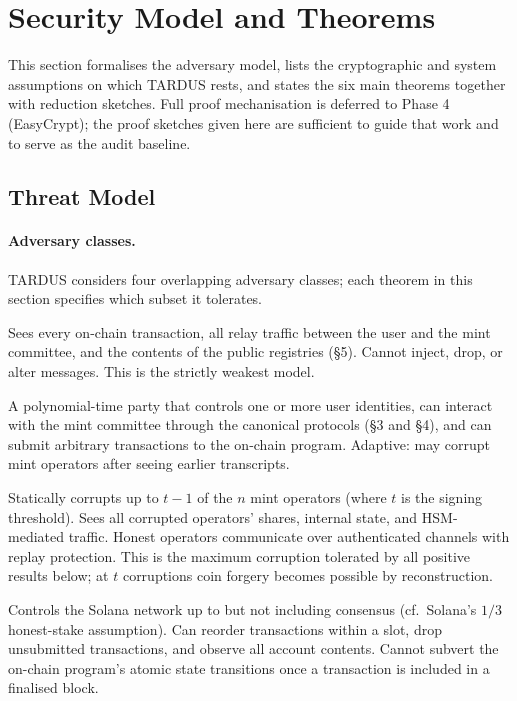 \section{Security Model and Theorems}
\label{sec:security}

This section formalises the adversary model, lists the cryptographic and
system assumptions on which TARDUS rests, and states the six main theorems
together with reduction sketches. Full proof mechanisation is deferred to
Phase 4 (EasyCrypt); the proof sketches given here are sufficient to guide
that work and to serve as the audit baseline.

\subsection{Threat Model}
\label{sec:threat-model}

\paragraph{Adversary classes.} TARDUS considers four overlapping adversary
classes; each theorem in this section specifies which subset it tolerates.

\begin{description}[leftmargin=2em,style=nextline]
  \item[$\Adv_{\mathsf{net}}$ (passive observer)]
    Sees every on-chain transaction, all relay traffic between the user and
    the mint committee, and the contents of the public registries
    (\S5). Cannot inject, drop, or alter messages. This is
    the strictly weakest model.
  \item[$\Adv_{\mathsf{user}}$ (malicious user)]
    A polynomial-time party that controls one or more user identities, can
    interact with the mint committee through the canonical protocols
    (\S3 and \S4), and can submit arbitrary
    transactions to the on-chain program. Adaptive: may corrupt mint
    operators after seeing earlier transcripts.
  \item[$\Adv_{\mathsf{mint},t-1}$ (corrupted mint minority)]
    Statically corrupts up to $t-1$ of the $n$ mint operators (where $t$ is
    the signing threshold). Sees all corrupted operators' shares, internal
    state, and HSM-mediated traffic. Honest operators communicate over
    authenticated channels with replay protection. This is the maximum
    corruption tolerated by all positive results below; at $t$ corruptions
    coin forgery becomes possible by reconstruction.
  \item[$\Adv_{\mathsf{chain}}$ (network-level adversary)]
    Controls the Solana network up to but not including consensus
    (cf.\ Solana's $1/3$ honest-stake assumption). Can reorder
    transactions within a slot, drop unsubmitted transactions, and observe
    all account contents. Cannot subvert the on-chain program's atomic
    state transitions once a transaction is included in a finalised block.
\end{description}

